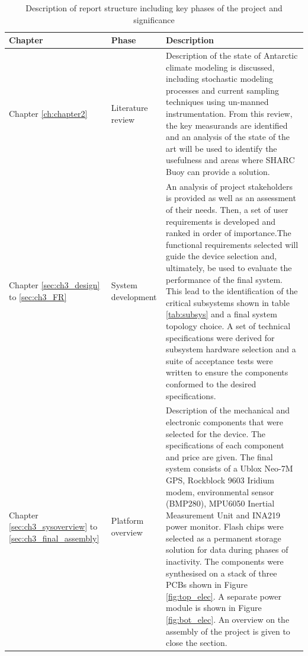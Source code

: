 \begin{center}
   {\setlength{\extrarowheight}{5pt}%
   	\footnotesize
    \begin{longtable}[H]{|>{\RaggedRight}m{}| >{\centering}m{} | 
   m{}|}
        \caption{Description of report structure including key phases of the project and
        significance}
        \label{tab:report_structure}\\
        \hline
        \textbf{Chapter} & \textbf{Phase} & \textbf{Description} \\
        \hline
        Chapter \ref{ch:chapter2} & Literature review & Description of the state of Antarctic climate modeling is discussed, including stochastic modeling processes and current sampling techniques using un-manned instrumentation. From this review, the key measurands are identified and an analysis of the state of the art will be used to identify the usefulness and areas where SHARC Buoy can provide a solution. \\
        \hline
        Chapter \ref{sec:ch3_design} to \ref{sec:ch3_FR} & System development &  An analysis of project stakeholders is provided as well as an assessment of their needs. Then, a set of user requirements is developed and ranked in order of importance.The functional requirements selected will guide the device selection and, ultimately, be used to evaluate the performance of the final system. This lead to the identification of the critical subsystems shown in table \ref{tab:subsys} and a final system topology choice. A set of technical specifications were derived for subsystem hardware selection and a suite of acceptance tests were written to ensure the components conformed to the desired specifications.\\
        \hline
        Chapter \ref{sec:ch3_sysoverview} to \ref{sec:ch3_final_assembly} & Platform overview & Description of the mechanical and electronic components that were selected for the device. The specifications of each component and price are given. The final system consists of a Ublox Neo-7M GPS, Rockblock 9603 Iridium modem, environmental sensor (BMP280), MPU6050 Inertial Measurement Unit and INA219 power monitor. Flash chips were selected as a permanent storage solution for data during phases of inactivity. The components were synthesised on a stack of three PCBs shown in Figure \ref{fig:top_elec}. A separate power module is shown in Figure \ref{fig:bot_elec}. An overview on the assembly of the project is given to close the section.\\

\end{longtable}}
\end{center}
